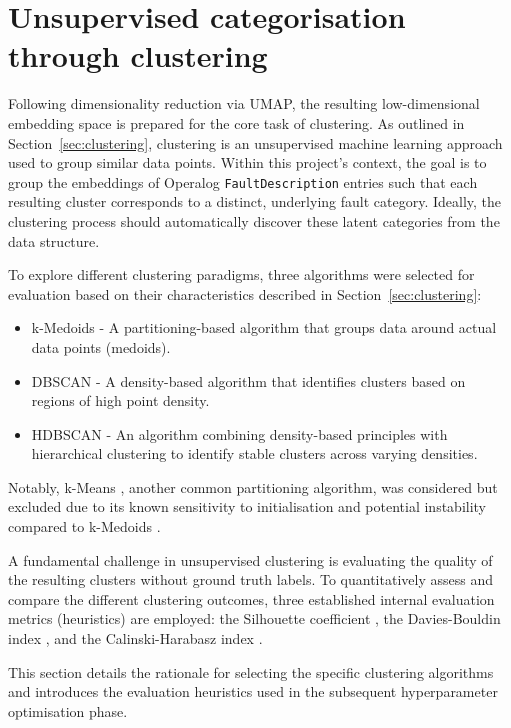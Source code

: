 \documentclass[10pt,oneside]{report}
\begin{document}
\section{Unsupervised categorisation through clustering}\label{sec:unsupcat}

Following dimensionality reduction via UMAP, the resulting low-dimensional embedding space is prepared for the core task of clustering. As outlined in Section~\ref{sec:clustering}, clustering is an unsupervised machine learning approach used to group similar data points. Within this project's context, the goal is to group the embeddings of Operalog \texttt{FaultDescription} entries such that each resulting cluster corresponds to a distinct, underlying fault category. Ideally, the clustering process should automatically discover these latent categories from the data structure.

To explore different clustering paradigms, three algorithms were selected for evaluation based on their characteristics described in Section~\ref{sec:clustering}:

\begin{itemize}
    \item k-Medoids \cite{kmedoids} - A partitioning-based algorithm that groups data around actual data points (medoids).
    \item DBSCAN \cite{ester1996density} - A density-based algorithm that identifies clusters based on regions of high point density.
    \item HDBSCAN \cite{campello2013density} - An algorithm combining density-based principles with hierarchical clustering to identify stable clusters across varying densities.
\end{itemize}

Notably, k-Means \cite{macqueen1967some}, another common partitioning algorithm, was considered but excluded due to its known sensitivity to initialisation and potential instability compared to k-Medoids \cite{zhang2008improved}.

A fundamental challenge in unsupervised clustering is evaluating the quality of the resulting clusters without ground truth labels. To quantitatively assess and compare the different clustering outcomes, three established internal evaluation metrics (heuristics) are employed: the Silhouette coefficient \cite{rousseeuw1987silhouettes}, the Davies-Bouldin index \cite{davies1979cluster}, and the Calinski-Harabasz index \cite{calinski1974dendrite}.

This section details the rationale for selecting the specific clustering algorithms and introduces the evaluation heuristics used in the subsequent hyperparameter optimisation phase.
\end{document}
